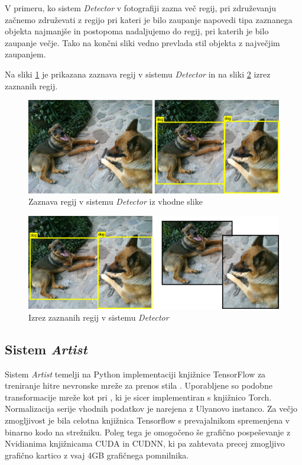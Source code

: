 \documentclass[runningheads,a4paper]{llncs}
\begin{document}
V primeru, ko sistem \textit{Detector} v fotografiji zazna več regij, pri združevanju začnemo združevati z regijo pri kateri je bilo zaupanje napovedi tipa zaznanega objekta najmanjše in postopoma nadaljujemo do regij, pri katerih je bilo zaupanje večje. Tako na končni sliki vedno prevlada stil objekta z največjim zaupanjem.

Na sliki \ref{fig:input_detector} je prikazana zaznava regij v sistemu \textit{Detector} in na sliki \ref{fig:detector} izrez zaznanih regij.

\begin{figure}[H]
\centering
\includegraphics[width=\textwidth, center]{figures/neural_example/input_detector.png}
\caption{Zaznava regij v sistemu \textit{Detector} iz vhodne slike}
\label{fig:input_detector}
\end{figure}

\begin{figure}[H]
\centering
\includegraphics[width=\textwidth, center]{figures/neural_example/detector.png}
\caption{Izrez zaznanih regij v sistemu \textit{Detector}}
\label{fig:detector}
\end{figure}

\subsection{Sistem \textit{Artist}}
Sistem \textit{Artist} temelji na Python implementaciji knjižnice TensorFlow za treniranje hitre nevronske mreže za prenos stila \cite{neural-style-fast}. Uporabljene so podobne transformacije mreže kot pri \cite{neural-style-johnson}, ki je sicer implementiran s knjižnico Torch. Normalizacija serije vhodnih podatkov je narejena z Ulyanovo instanco. Za večjo zmogljivost je bila celotna knjižnica Tensorflow s prevajalnikom spremenjena v binarno kodo na strežniku. Poleg tega je omogočeno še grafično pospeševanje z Nvidianima knjižnicama CUDA in CUDNN, ki pa zahtevata precej zmogljivo grafično kartico z vsaj 4GB grafičnega pomnilnika.
\end{document}
